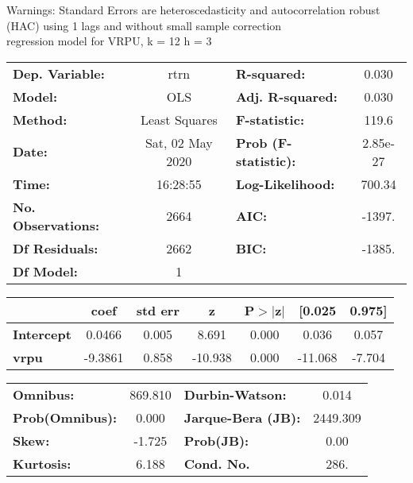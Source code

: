 Warnings: \newline
 [1] Standard Errors are heteroscedasticity and autocorrelation robust (HAC) using 1 lags and without small sample correction\\ 

regression model for VRPU, k = 12 h = 3\begin{center}
\begin{tabular}{lclc}
\toprule
\textbf{Dep. Variable:}    &       rtrn       & \textbf{  R-squared:         } &     0.030   \\
\textbf{Model:}            &       OLS        & \textbf{  Adj. R-squared:    } &     0.030   \\
\textbf{Method:}           &  Least Squares   & \textbf{  F-statistic:       } &     119.6   \\
\textbf{Date:}             & Sat, 02 May 2020 & \textbf{  Prob (F-statistic):} &  2.85e-27   \\
\textbf{Time:}             &     16:28:55     & \textbf{  Log-Likelihood:    } &    700.34   \\
\textbf{No. Observations:} &        2664      & \textbf{  AIC:               } &    -1397.   \\
\textbf{Df Residuals:}     &        2662      & \textbf{  BIC:               } &    -1385.   \\
\textbf{Df Model:}         &           1      & \textbf{                     } &             \\
\bottomrule
\end{tabular}
\begin{tabular}{lcccccc}
                   & \textbf{coef} & \textbf{std err} & \textbf{z} & \textbf{P$> |$z$|$} & \textbf{[0.025} & \textbf{0.975]}  \\
\midrule
\textbf{Intercept} &       0.0466  &        0.005     &     8.691  &         0.000        &        0.036    &        0.057     \\
\textbf{vrpu}      &      -9.3861  &        0.858     &   -10.938  &         0.000        &      -11.068    &       -7.704     \\
\bottomrule
\end{tabular}
\begin{tabular}{lclc}
\textbf{Omnibus:}       & 869.810 & \textbf{  Durbin-Watson:     } &    0.014  \\
\textbf{Prob(Omnibus):} &   0.000 & \textbf{  Jarque-Bera (JB):  } & 2449.309  \\
\textbf{Skew:}          &  -1.725 & \textbf{  Prob(JB):          } &     0.00  \\
\textbf{Kurtosis:}      &   6.188 & \textbf{  Cond. No.          } &     286.  \\
\bottomrule
\end{tabular}
\end{center}

